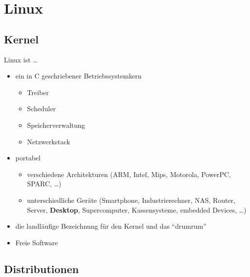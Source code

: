 \documentclass{beamer}
\makeatletter
\newcommand{\strong}[1]{\@strong{#1}}
\newcommand{\@@strong}[1]{\textbf{\let\@strong\@@@strong#1}}
\newcommand{\@@@strong}[1]{\textnormal{\let\@strong\@@strong#1}}
\let\@strong\@@strong
\makeatother
\begin{document}
\section{Linux}

\frame{\tableofcontents[currentsection]}

\subsection{Kernel}

\begin{frame}{Linux ist …}
    \begin{itemize}
        \item ein in C geschriebener Betriebssystemkern
            \begin{itemize}
                \item Treiber
                \item Scheduler
                \item Speicherverwaltung
                \item Netzwerkstack
            \end{itemize}
        \pause
        \item portabel
            \begin{itemize}
                \item verschiedene Architekturen (ARM, Intel, Mips,
                    Motorola, PowerPC, SPARC, …)
                \item unterschiedliche Geräte (Smartphone,
                    Industrierechner, NAS, Router, Server,
                    \strong{Desktop}, Supercomputer, Kassensysteme,
                    embedded Devices, …)
            \end{itemize}
        \pause
        \item die landläufige Bezeichnung für den Kernel und das \enquote{drumrum}
        \pause
        \item Freie Software
    \end{itemize}
\end{frame}

\subsection{Distributionen}
\end{document}
